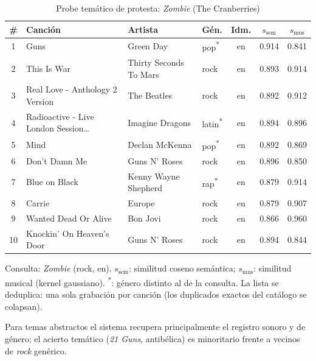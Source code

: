\begin{table}[htbp]
  \centering
  \begin{threeparttable}
  \caption{Probe temático de protesta: \emph{Zombie} (The Cranberries)}
  \label{tab:qual_probe_protesta}
  \small
  \setlength{\tabcolsep}{4pt}
  \begin{tabular}{@{}c >{\raggedright\arraybackslash}p{4.0cm} >{\raggedright\arraybackslash}p{2.8cm} l c c c@{}}
    \toprule
    \# & Canción & Artista & Gén. & Idm. & $s_{\text{sem}}$ & $s_{\text{mus}}$ \\
    \midrule
    1 & 21 Guns & Green Day & pop\textsuperscript{*} & en & 0.914 & 0.841 \\
    2 & This Is War & Thirty Seconds To Mars & rock & en & 0.893 & 0.914 \\
    3 & Real Love - Anthology 2 Version & The Beatles & rock & en & 0.892 & 0.912 \\
    4 & Radioactive - Live London Session\ldots & Imagine Dragons & latin\textsuperscript{*} & en & 0.894 & 0.896 \\
    5 & Mind & Declan McKenna & pop\textsuperscript{*} & en & 0.892 & 0.869 \\
    6 & Don't Damn Me & Guns N' Roses & rock & en & 0.896 & 0.850 \\
    7 & Blue on Black & Kenny Wayne Shepherd & rap\textsuperscript{*} & en & 0.879 & 0.914 \\
    8 & Carrie & Europe & rock & en & 0.879 & 0.907 \\
    9 & Wanted Dead Or Alive & Bon Jovi & rock & en & 0.866 & 0.960 \\
    10 & Knockin' On Heaven's Door & Guns N' Roses & rock & en & 0.894 & 0.844 \\
    \bottomrule
  \end{tabular}
  \begin{tablenotes}[flushleft]
    \small
    \item Consulta: \emph{Zombie} (rock, en). $s_{\text{sem}}$: similitud coseno semántica; $s_{\text{mus}}$: similitud musical (kernel gaussiano). \textsuperscript{*}: género distinto al de la consulta. La lista se deduplica: una sola grabación por canción (los duplicados exactos del catálogo se colapsan).
    \item Para temas abstractos el sistema recupera principalmente el registro sonoro y de género; el acierto temático (\emph{21 Guns}, antibélica) es minoritario frente a vecinos de \textit{rock} genérico.
  \end{tablenotes}
  \end{threeparttable}
\end{table}